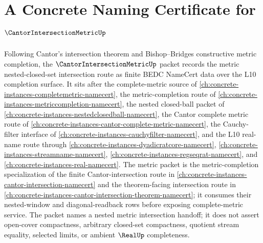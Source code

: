 \chapter{A Concrete Naming Certificate for $\CantorIntersectionMetricUp$}
\label{ch:concrete-instances-cantor-intersection-metric-namecert}

Following Cantor's intersection theorem and Bishop--Bridges constructive metric completion, the $\CantorIntersectionMetricUp$ packet records the metric nested-closed-set intersection route as finite BEDC NameCert data over the L10 completion surface. It sits after the complete-metric source of \autoref{ch:concrete-instances-completemetric-namecert}, the metric-completion route of \autoref{ch:concrete-instances-metriccompletion-namecert}, the nested closed-ball packet of \autoref{ch:concrete-instances-nestedclosedball-namecert}, the Cantor complete metric route of \autoref{ch:concrete-instances-cantor-complete-metric-namecert}, the Cauchy-filter interface of \autoref{ch:concrete-instances-cauchyfilter-namecert}, and the L10 real-name route through \autoref{ch:concrete-instances-dyadicratcore-namecert}, \autoref{ch:concrete-instances-streamname-namecert}, \autoref{ch:concrete-instances-regseqrat-namecert}, and \autoref{ch:concrete-instances-real-namecert}. The metric packet is the metric-completion specialization of the finite Cantor-intersection route in \autoref{ch:concrete-instances-cantor-intersection-namecert} and the theorem-facing intersection route in \autoref{ch:concrete-instances-cantor-intersection-theorem-namecert}; it consumes their nested-window and diagonal-readback rows before exposing complete-metric service. The packet names a nested metric intersection handoff; it does not assert open-cover compactness, arbitrary closed-set compactness, quotient stream equality, selected limits, or ambient $\RealUp$ completeness.

